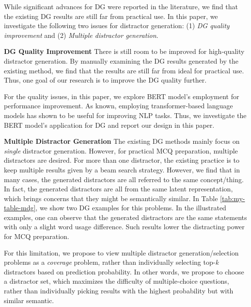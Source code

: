 \documentclass[11pt,a4paper]{article}
\begin{document}
While significant advances for DG were reported in the literature, we find that the existing DG results are still far from practical use. In this paper, we investigate the following two issues for distractor generation: (1) \textit{DG quality improvement} and (2) \textit{Multiple distractor generation}. 

\noindent\textbf{DG Quality Improvement}
There is still room to be improved for high-quality distractor generation. 
By manually examining the DG results generated by the existing method, we find that the results are still far from ideal for practical use. Thus, one goal of our research is to improve the DG quality further. 

For the quality issues, in this paper, we explore BERT model's employment for performance improvement. As known, employing transformer-based language
models has shown to be useful for improving
NLP tasks. Thus, we investigate the BERT model's application for DG and report our design in this paper.

\noindent\textbf{Multiple Distractor Generation} The existing DG methods mainly focus on \textit{single} distractor generation. However, for practical MCQ preparation, multiple distractors are desired. For more than one distractor, the existing practice is to keep multiple results given by a beam search strategy. However, we find that in many cases, the generated distractors are all referred to the same concept/thing. In fact, the generated distractors are all from the same latent representation, which brings concerns that they might be semantically similar. In Table \ref{tab:my-table-mdg}, we show two DG examples for this problems. In the illustrated examples, one can observe that the generated distractors are the same statements with only a slight word usage difference. Such results lower the distracting power for MCQ preparation. 

For this limitation, we propose to view multiple distractor generation/selection problems as a \textit{coverage} problem, rather than individually selecting top-\textit{k} distractors based on prediction probability. In other words, we propose to choose a distractor set, which maximizes the difficulty of multiple-choice questions, rather than individually picking results with the highest probability but with similar semantic. 
\end{document}
